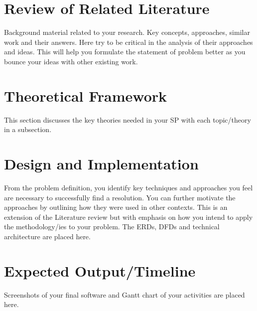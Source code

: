 \documentclass[11pt,a4paper,titlepage]{article}
\let\stdsection\section
\renewcommand\section{\newpage\stdsection}
\begin{document}
\section{Review of Related Literature}

Background material related to your research. Key concepts, approaches, similar work and their answers. Here try to be critical in the analysis of their approaches and ideas. This will help you formulate the statement of problem better as you bounce your ideas with other existing work.

\section{Theoretical Framework}

This section discusses the key theories needed in your SP with each topic/theory in a subsection.

\section{Design and Implementation}
From the problem definition, you identify key techniques and approaches you feel are necessary to successfully find a resolution. You can further motivate the approaches by outlining how they were used in other contexts. This is an extension of the Literature review but with emphasis on how you intend to apply the methodology/ies to your problem. The ERDs, DFDs and technical architecture are placed here.

\section{Expected Output/Timeline}

Screenshots of your final software and Gantt chart of your activities are placed here.

\clearpage


\end{document}
